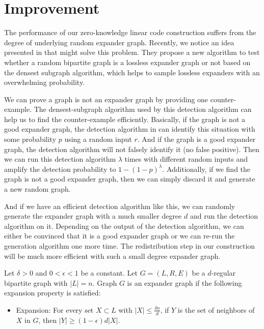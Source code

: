 \section{Improvement}

The performance of our zero-knowledge linear code construction suffers from the degree of underlying random expander graph. Recently, we notice an idea presented in \cite{orion} that might solve this problem. They propose a new algorithm to test whether a random bipartite graph is a lossless expander graph or not based on the densest subgraph algorithm, which helps to sample lossless expanders with an overwhelming probability.

We can prove a graph is not an expander graph by providing one counter-example. The densest-subgraph algorithm used by this detection algorithm can help us to find the counter-example efficiently.
Basically, if the graph is not a good expander graph, the detection algorithm in \cite{orion} can identify this situation with some probability $p$ using a random input $r$. And if the graph is a good expander graph, the detection algorithm will not falsely identify it (no false positive). Then we can run this detection algorithm $\lambda$ times with different random inputs and amplify the detection probability to $1 - (1 - p)^\lambda$. Additionally, if we find the graph is not a good expander graph, then we can simply discard it and generate a new random graph.


And if we have an efficient detection algorithm like this, we can randomly generate the expander graph with a much smaller degree $d$ and run the detection algorithm on it. Depending on the output of the detection algorithm, we can either be convinced that it is a good expander graph or we can re-run the generation algorithm one more time. The redistribution step in our construction will be much more efficient with such a small degree expander graph.


\begin{definition}
\label{definition:randomgraph2}

Let $\delta > 0$ and $0 < \epsilon < 1$ be a constant. Let $G=(L, R, E)$ be a $d$-regular bipartite graph with $|L| = n$. Graph $G$ is an expander graph if the following expansion property is satisfied:

    \begin{itemize}
        \item Expansion: For every set $X \subset L$ with $|X| \le \frac{\delta n}{d}$, if $Y$ is the set of neighbors of $X$ in $G$, then $|Y| \ge (1 - \epsilon) d |X|$.
    \end{itemize}

\end{definition}

